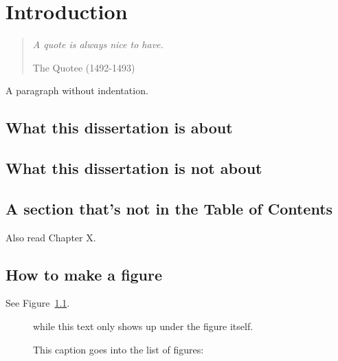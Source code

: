 %
%

\chapter{Introduction}


\begin{quote}

{\em A quote is always nice to have.}

 The Quotee (1492-1493)

\end{quote}


\noindent
A paragraph without indentation.



\section{What this dissertation is about}

\section{What this dissertation is not about}



\pagebreak
\section*{A section that's not in the Table of Contents}

Also read Chapter X.


\section{How to make a figure}

See Figure~\ref{fig:figure_reference}.

\begin{figure}[htb]
\figsp
\begin{center}
\end{center}
\caption{This caption goes into the list of figures:}
while this text only shows up under the figure itself.
\label{fig:figure_reference}
\end{figure}


